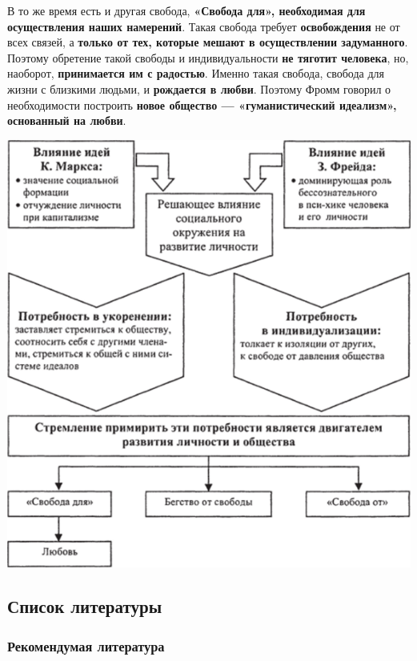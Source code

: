 \documentclass{article}
\begin{document}
\begin{flushleft}
\hfill

В то же время есть и другая свобода, \textbf{«Свобода для», необходимая для осуществления наших намерений}. Такая свобода требует \textbf{освобождения} не от всех связей, а \textbf{только от тех, которые мешают в осуществлении задуманного}. Поэтому обретение такой свободы и индивидуальности \textbf{не тяготит человека}, но, наоборот, \textbf{принимается им с радостью}. Именно такая свобода, свобода для жизни с близкими людьми, и \textbf{рождается в любви}. Поэтому Фромм говорил о необходимости построить \textbf{новое общество — «гуманистический идеализм», основанный на любви}.

\hfill

\includegraphics[width=\textwidth]{erich_fromm}

\end{flushleft}

\pagebreak
\subsection{Список литературы}

\subsubsection{Рекомендумая литература}
\end{document}
